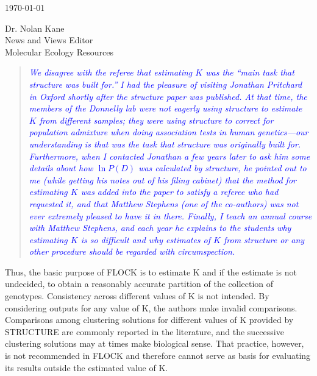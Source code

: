 \documentclass[11pt]{letter}
\newcommand{\reply}[1]{\begin{quotation}\small\sl\textcolor{blue}{#1}\end{quotation}}
\begin{document}
\begin{letter}{ \today 

Dr. Nolan Kane\\
News and Views Editor\\
Molecular Ecology Resources \\
}
\reply{We disagree with the referee that estimating $K$ was the ``main task that {\sc structure} was
built for.''  I had the pleasure of visiting Jonathan Pritchard in Oxford shortly after the
{\sc structure} paper was published. At that time, the members of the Donnelly lab were not eagerly using
{\sc structure} to estimate $K$ from different samples; they were using {\sc structure} to correct
for population admixture when doing association tests in human genetics---our understanding
is {\em that} was the task that structure was originally built for.  Furthermore, when I contacted
Jonathan a few years later to ask him some details about how $\ln P(D)$ was calculated by {\sc structure},
he pointed out to me (while getting his notes out of his filing cabinet) that the method for estimating
$K$ was added into the paper to satisfy a referee who had requested it, and that Matthew Stephens 
(one of the co-authors) was not ever extremely pleased to have it in there.  Finally, I teach an annual
course with Matthew Stephens, and each year he explains to the students why estimating $K$ is so
difficult and why estimates of $K$ from {\sc structure} or any other procedure should be 
regarded with circumspection.  }


Thus, the basic purpose of FLOCK is to estimate K and if the estimate is not undecided, to obtain a reasonably accurate partition of the collection of genotypes. Consistency across different values of K is not intended. By considering outputs for any value of K, the authors make invalid comparisons. Comparisons among clustering solutions for different values of K provided by STRUCTURE are commonly reported in the literature, and the successive clustering solutions may at times make biological sense. That practice, however, is not recommended in FLOCK and therefore cannot serve as basis for evaluating its results outside the estimated value of K.


\end{letter}
\end{document}
